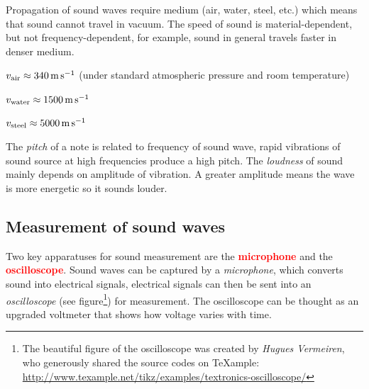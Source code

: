 \documentclass[a4paper,12pt]{book}
\newcounter{example}[chapter]
\newcommand{\keypoint}[1]{\textbf{\textcolor{red}{#1}}}
\newcommand{\titem}{\item}
\newcommand{\mps}{\,\text{m\,s}^{-1}}
\newcommand{\keypoint}[1]{\textbf{\textcolor{red}{#1}}}
\begin{document}
\begin{figure}[ht]

\end{figure}

Propagation of sound waves require medium (air, water, steel, etc.) which means that sound cannot travel in vacuum. The speed of sound is material-dependent, but not frequency-dependent, for example, sound in general travels faster in denser medium.
	
	\titem $v_\text{air} \approx 340 \mps$ (under standard atmospheric pressure and room temperature)
	
	\titem $v_\text{water} \approx 1500 \mps$
	
	\titem $v_\text{steel} \approx 5000 \mps$
	
The \emph{pitch} of a note is related to frequency of sound wave, rapid vibrations of sound source at high frequencies produce a high pitch. The \emph{loudness} of sound mainly depends on amplitude of vibration. A greater amplitude means the wave is more energetic so it sounds louder.
	
\subsection*{Measurement of sound waves}

Two key apparatuses for sound measurement are the \keypoint{microphone} and the \keypoint{oscilloscope}. 
Sound waves can be captured by a \emph{microphone}, which converts sound into electrical signals, electrical signals can then be sent into an \emph{oscilloscope} (see figure\footnote{The beautiful figure of the oscilloscope was created by \emph{Hugues Vermeiren}, who generously shared the source codes on TeXample: \url{http://www.texample.net/tikz/examples/textronics-oscilloscope/}}) for measurement. The oscilloscope can be thought as an upgraded voltmeter that shows how voltage varies with time.
\end{document}
